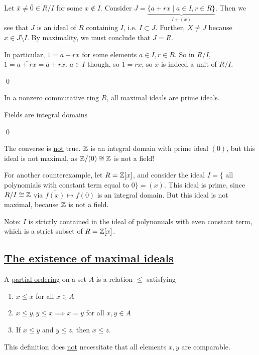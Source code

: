 \documentclass[x11names,reqno,14pt]{extarticle}
\begin{document}
Let $\bar{x} \neq \bar{0}\in R/I$ for some $x \not\in I$. Consider $J = \underbrace{\{a + rx \mid a \in I, r \in R\}}_{I + (x)}$. Then we see that $J$ is an ideal of $R$ containing $I$, i.e. $I \subset J$. Further, $X\neq J$ because $x \in J\setminus I$. By maximality, we must conclude that $J = R$. 

In particular, $1 = a + rx$ for some elements $a \in I, r \in R$. So in $R/I$, $\bar{1} = \bar{a + rx} = \bar{a} + \bar{rx}$. $a \in I$ though, so $\bar{1} = \bar{rx}$, so $\bar{x}$ is indeed a unit of $R/I$. 

\qed

\cor

In a nonzero commutative ring $R$, all maximal ideals are prime ideals. 

\proof

Fields are integral domains

\qed

\rem The converse is \underline{not} true. $\mathbb{Z}$ is an integral domain with prime ideal $(0)$, but this ideal is not maximal, as $\mathbb{Z}/(0) \cong \mathbb{Z}$ is not a field!

For another counterexample, let $R = \mathbb{Z}[x]$, and consider the ideal $I = \{$ all polynomials with constant term equal to $ 0\} = (x)$.  This ideal is prime, since $R/I \cong \mathbb{Z}$ via $\bar{f(x)} \mapsto f(0)$ is an integral domain. But this ideal is not maximal, because $\mathbb{Z}$ is not a field. 

Note: $I$ is strictly contained in the ideal of polynomials with even constant term, which is a strict subset of $R = \mathbb{Z}[x]$.

\subsection*{\underline{The existence of maximal ideals}}


A \underline{partial ordering} on a set $A$ is a relation $\leq$ satisfying 
\begin{enumerate}
\item $x \leq x$ for all $x \in A$
\item $x \leq y, y \leq x \implies x = y$ for all $x, y \in A$
\item If $x \leq y$ and $y \leq z$, then $x \leq z$. 
\end{enumerate}

\rem This definition does \underline{not} necessitate that all elements $x, y$ are comparable. 
\end{document}

